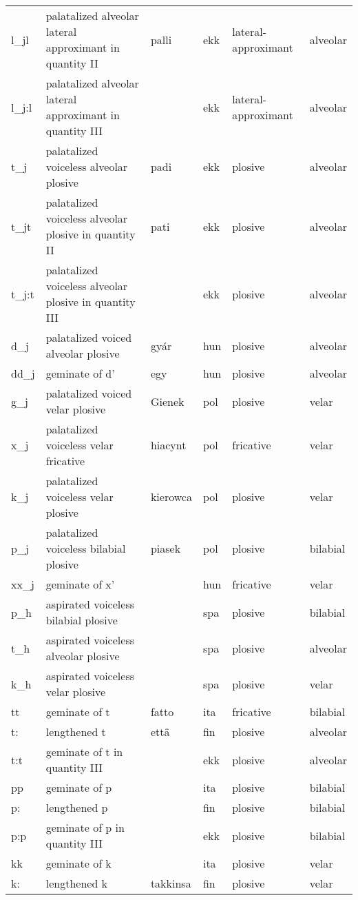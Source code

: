 {\begin{longtable}{l|p{.3\linewidth}|p{.15\linewidth}|l|p{.15\linewidth}|l}
	l\_jl	& palatalized alveolar lateral approximant in quantity II	& palli	& ekk	& lateral-approximant	& alveolar	\\
	l\_j:l	& palatalized alveolar lateral approximant in quantity III	& 	& ekk	& lateral-approximant	& alveolar	\\
	t\_j	& palatalized voiceless alveolar plosive	& padi	& ekk	& plosive	& alveolar	\\
	t\_jt	& palatalized voiceless alveolar plosive in quantity II	& pati	& ekk	& plosive	& alveolar	\\
	t\_j:t	& palatalized voiceless alveolar plosive in quantity III	& 	& ekk	& plosive	& alveolar	\\
	d\_j	& palatalized voiced alveolar plosive	& gyár	& hun	& plosive	& alveolar	\\
	dd\_j	& geminate of d'	& egy	& hun	& plosive	& alveolar	\\
	g\_j	& palatalized voiced velar plosive	& Gienek	& pol	& plosive	& velar	\\
	x\_j	& palatalized voiceless velar fricative	& hiacynt	& pol	& fricative	& velar	\\
	k\_j	& palatalized voiceless velar plosive	& kierowca	& pol	& plosive	& velar	\\
	p\_j	& palatalized voiceless bilabial plosive	& piasek	& pol	& plosive	& bilabial	\\
	xx\_j	& geminate of x'	& 	& hun	& fricative	& velar	\\
	p\_h	& aspirated voiceless bilabial plosive	& 	& spa	& plosive	& bilabial	\\
	t\_h	& aspirated voiceless alveolar plosive	& 	& spa	& plosive	& alveolar	\\
	k\_h	& aspirated voiceless velar plosive	& 	& spa	& plosive	& velar	\\
	tt	& geminate of t	& fatto	& ita	& fricative	& bilabial	\\
	t:	& lengthened t	& että	& fin	& plosive	& alveolar	\\
	t:t	& geminate of t in quantity III	& 	& ekk	& plosive	& alveolar	\\
	pp	& geminate of p	& 	& ita	& plosive	& bilabial	\\
	p:	& lengthened p	& 	& fin	& plosive	& bilabial	\\
	p:p	& geminate of p in quantity III	& 	& ekk	& plosive	& bilabial	\\
	kk	& geminate of k	& 	& ita	& plosive	& velar	\\
	k:	& lengthened k	& takkinsa	& fin	& plosive	& velar	\\

\end{longtable}}
